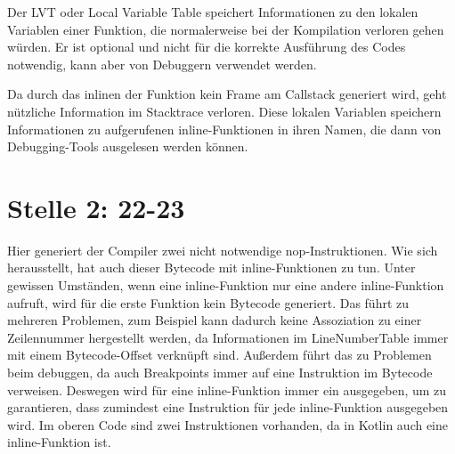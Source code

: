 Der LVT oder Local Variable Table speichert Informationen zu den lokalen Variablen einer Funktion, die normalerweise
bei der Kompilation verloren gehen würden.
Er ist optional und nicht für die korrekte Ausführung des Codes notwendig, kann aber von
Debuggern verwendet werden.\cite{jvmspecLVT}

Da durch das inlinen der Funktion kein Frame am Callstack generiert wird, geht nützliche Information im Stacktrace
verloren.
Diese lokalen Variablen speichern Informationen zu aufgerufenen inline-Funktionen in ihren Namen, die dann von
Debugging-Tools ausgelesen werden können.\cite{youTrackFakeVariables}

\section{Stelle 2: 22-23}

Hier generiert der Compiler zwei nicht notwendige nop-Instruktionen.
Wie sich herausstellt, hat auch dieser Bytecode mit inline-Funktionen zu tun.
Unter gewissen Umständen, \zB wenn eine inline-Funktion nur eine andere inline-Funktion aufruft,
wird für die erste Funktion kein Bytecode generiert.
Das führt zu mehreren Problemen, zum Beispiel kann dadurch keine Assoziation zu einer Zeilennummer hergestellt werden,
da Informationen im LineNumberTable immer mit einem Bytecode-Offset verknüpft sind.
Außerdem führt das zu Problemen beim debuggen, da auch Breakpoints immer auf eine Instruktion im Bytecode verweisen.
Deswegen wird für eine inline-Funktion immer ein  ausgegeben, um zu garantieren, dass
zumindest eine Instruktion für jede inline-Funktion ausgegeben wird.
Im oberen Code sind zwei  Instruktionen vorhanden, da in Kotlin  auch eine
inline-Funktion ist.\cite{youTrackNops}

\renewcommand{\kapitelautor}{}
